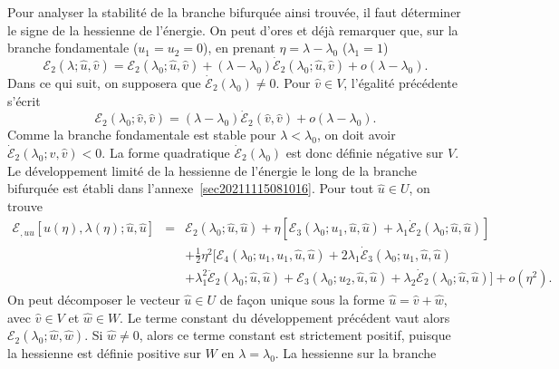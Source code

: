 \documentclass[12pt, final]{amsart}
\begin{document}
Pour analyser la stabilité de la branche bifurquée ainsi trouvée,
il faut déterminer le signe de la hessienne de l'énergie. On peut
d'ores et déj{\`a} remarquer que, sur la branche fondamentale ($u_1 = u_2
= 0$), en prenant $\eta = \lambda - \lambda_0$ ($\lambda_1 = 1$)
\begin{equation}
  \mathcal{E}_2 (\lambda ; \hat{u}, \hat{v}) =\mathcal{E}_2 (\lambda_0 ;
  \hat{u}, \hat{v}) + (\lambda - \lambda_0)  \dot{\mathcal{E}}_2 (\lambda_0 ;
  \hat{u}, \hat{v}) + o (\lambda - \lambda_0) .
\end{equation}
Dans ce qui suit, on supposera que $\dot{\mathcal{E}}_2 (\lambda_0) \neq 0$.
Pour $\hat{v} \in V$, l'égalité précédente s'écrit
\begin{equation}
  \mathcal{E}_2 (\lambda_0 ; \hat{v}, \hat{v}) = (\lambda - \lambda_0)
  \dot{\mathcal{E}}_2 (\hat{v}, \hat{v}) + o (\lambda - \lambda_0) .
\end{equation}
Comme la branche fondamentale est stable pour $\lambda < \lambda_0$, on doit
avoir $\dot{\mathcal{E}}_2 (\lambda_0 ; \hat{v}, \hat{v}) < 0$. La forme
quadratique $\dot{\mathcal{E}}_2 (\lambda_0)$ est donc définie
négative sur $V$. Le développement limité de la hessienne de
l'énergie le long de la branche bifurquée est établi dans
l'annexe~\ref{sec20211115081016}. Pour tout $\hat{u} \in U$, on trouve
\begin{eqnarray}
  \mathcal{E}_{, u  u} [u (\eta), \lambda (\eta) ; \hat{u}, \hat{u}] &
  = & \mathcal{E}_2 (\lambda_0 ; \hat{u}, \hat{u}) + \eta [\mathcal{E}_3
  (\lambda_0 ; u_1, \hat{u}, \hat{u}) + \lambda_1  \dot{\mathcal{E}}_2
  (\lambda_0 ; \hat{u}, \hat{u})] \nonumber\\
  &  & + \tfrac{1}{2} \eta^2  [\mathcal{E}_4 (\lambda_0 ; u_1, u_1, \hat{u},
  \hat{u}) + 2 \lambda_1  \dot{\mathcal{E}}_3 (\lambda_0 ; u_1, \hat{u},
  \hat{u})  \nonumber\\
  &  & + \lambda_1^2  \ddot{\mathcal{E}}_2 (\lambda_0 ; \hat{u}, \hat{u})
  +\mathcal{E}_3 (\lambda_0 ; u_2, \hat{u}, \hat{u})  + \lambda_2
  \dot{\mathcal{E}}_2 (\lambda_0 ; \hat{u}, \hat{u})] + o (\eta^2) .
  \label{eq20211115082025}
\end{eqnarray}
On peut décomposer le vecteur $\hat{u} \in U$ de fa{\c c}on unique sous la
forme $\hat{u} = \hat{v} + \hat{w}$, avec $\hat{v} \in V$ et $\hat{w} \in W$.
Le terme constant du développement précédent vaut alors
$\mathcal{E}_2 (\lambda_0 ; \hat{w}, \hat{w})$. Si $\hat{w} \neq 0$, alors ce
terme constant est strictement positif, puisque la hessienne est définie
positive sur $W$ en $\lambda = \lambda_0$. La hessienne sur la branche
\end{document}
